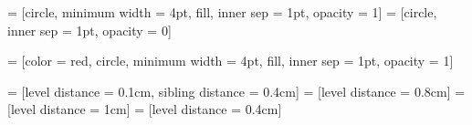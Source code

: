  = [circle, minimum width = 4pt, fill, inner sep = 1pt,
	opacity = 1]
 = [circle, inner sep = 1pt, opacity = 0]


	 = [color = red, circle, minimum width = 4pt, fill, inner sep = 1pt,
		opacity = 1]
            
 = [level distance = 0.1cm, sibling distance = 0.4cm]
 = [level distance = 0.8cm]
 = [level distance = 1cm]
 = [level distance = 0.4cm]


